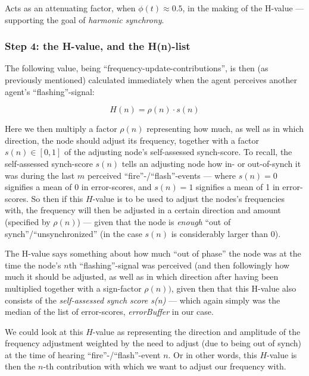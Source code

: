 	Acts as an attenuating factor, when $\phi(t)\approx0.5$, in the making of the H-value — supporting the goal of \textit{harmonic synchrony}.

	\subsubsection{Step 4: the H-value, and the H(n)-list}
	
	The following value, being ``frequency-update-contributions'', is then (as previously mentioned) calculated immediately when the agent perceives another agent's ``flashing''-signal:
	
	\begin{equation}
	\label{h_value}
		H(n) = \rho(n) \cdot s(n)
	\end{equation}
	
	Here we then multiply a factor $\rho(n)$ representing how much, as well as in which direction, the node should adjust its frequency, together with a factor $s(n) \in [0,1]$ of the adjusting node's self-assessed synch-score. To recall, the self-assessed synch-score $s(n)$ tells an adjusting node how in- or out-of-synch it was during the last $m$ perceived ``fire''-/``flash''-events — where $s(n)=0$ signifies a mean of 0 in error-scores, and $s(n)=1$ signifies a mean of 1 in error-scores. So then if this $H$-value is to be used to adjust the nodes's frequencies with, the frequency will then be adjusted in a certain direction and amount (specified by $\rho(n)$) — given that the node is \textit{enough} ``out of synch''/``unsynchronized'' (in the case $s(n)$ is considerably larger than 0).
	
	The H-value says something about how much ``out of phase'' the node was at the time the node's $n$th ``flashing''-signal was perceived (and then followingly how much it should be adjusted, as well as in which direction after having been multiplied together with a sign-factor $\rho(n))$, given then that this H-value also consists of the \textit{self-assessed synch score s(n)} — which again simply was the median of the list of error-scores, \textit{errorBuffer} in our case.
	
	We could look at this $H$-value as representing the direction and amplitude of the frequency adjustment weighted by the need to adjust (due to being out of synch) at the time of hearing ``fire''-/``flash''-event $n$. Or in other words, this $H$-value is then the $n$-th contribution with which we want to adjust our frequency with.
	

